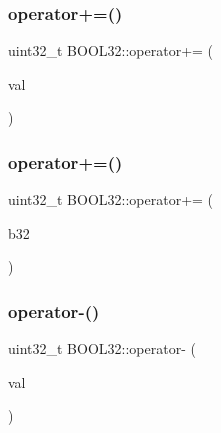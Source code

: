 \hypertarget{struct_b_o_o_l32_aee7cc8e8189647b8812cd73a5a6d2730}{}\label{struct_b_o_o_l32_aee7cc8e8189647b8812cd73a5a6d2730} 
\subsubsection{\texorpdfstring{operator+=()}{operator+=()}\hspace{0.1cm}{\footnotesize\ttfamily [1/2]}}
{\footnotesize\ttfamily uint32\+\_\+t B\+O\+O\+L32\+::operator+= (\begin{DoxyParamCaption}\item[{const uint32\+\_\+t}]{val }\end{DoxyParamCaption})\hspace{0.3cm}{\ttfamily [inline]}}

\hypertarget{struct_b_o_o_l32_aa5f5168d040732ad4e2f32544b857ed3}{}\label{struct_b_o_o_l32_aa5f5168d040732ad4e2f32544b857ed3} 
\subsubsection{\texorpdfstring{operator+=()}{operator+=()}\hspace{0.1cm}{\footnotesize\ttfamily [2/2]}}
{\footnotesize\ttfamily uint32\+\_\+t B\+O\+O\+L32\+::operator+= (\begin{DoxyParamCaption}\item[{const \hyperlink{struct_b_o_o_l32}{B\+O\+O\+L32}}]{b32 }\end{DoxyParamCaption})\hspace{0.3cm}{\ttfamily [inline]}}

\hypertarget{struct_b_o_o_l32_a5813927e84bb669873f9015cf9cac108}{}\label{struct_b_o_o_l32_a5813927e84bb669873f9015cf9cac108} 
\subsubsection{\texorpdfstring{operator-\/()}{operator-()}\hspace{0.1cm}{\footnotesize\ttfamily [1/2]}}
{\footnotesize\ttfamily uint32\+\_\+t B\+O\+O\+L32\+::operator-\/ (\begin{DoxyParamCaption}\item[{const uint32\+\_\+t}]{val }\end{DoxyParamCaption})\hspace{0.3cm}{\ttfamily [inline]}}

